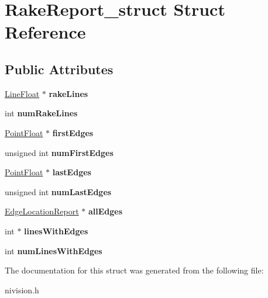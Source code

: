 \hypertarget{structRakeReport__struct}{\section{\-Rake\-Report\-\_\-struct \-Struct \-Reference}
\label{structRakeReport__struct}
}
\subsection*{\-Public \-Attributes}
\begin{DoxyCompactItemize}
\item 
\hypertarget{structRakeReport__struct_a276bba2b546a316be66d5e752a305bc9}{\hyperlink{structLineFloat__struct}{\-Line\-Float} $\ast$ {\bfseries rake\-Lines}}\label{structRakeReport__struct_a276bba2b546a316be66d5e752a305bc9}

\item 
\hypertarget{structRakeReport__struct_afddc894d706aaebec5d45d087aa1ed3c}{int {\bfseries num\-Rake\-Lines}}\label{structRakeReport__struct_afddc894d706aaebec5d45d087aa1ed3c}

\item 
\hypertarget{structRakeReport__struct_ac42787ae1e409a510756bbe14e24ad09}{\hyperlink{structPointFloat__struct}{\-Point\-Float} $\ast$ {\bfseries first\-Edges}}\label{structRakeReport__struct_ac42787ae1e409a510756bbe14e24ad09}

\item 
\hypertarget{structRakeReport__struct_ab037f1b1f28514231ff44f99e2f6457b}{unsigned int {\bfseries num\-First\-Edges}}\label{structRakeReport__struct_ab037f1b1f28514231ff44f99e2f6457b}

\item 
\hypertarget{structRakeReport__struct_a02baaf2e3560e8054f9ccb9cd397f7c2}{\hyperlink{structPointFloat__struct}{\-Point\-Float} $\ast$ {\bfseries last\-Edges}}\label{structRakeReport__struct_a02baaf2e3560e8054f9ccb9cd397f7c2}

\item 
\hypertarget{structRakeReport__struct_a5a8f3e5b0e91f779d1f5cc67f46b6f2c}{unsigned int {\bfseries num\-Last\-Edges}}\label{structRakeReport__struct_a5a8f3e5b0e91f779d1f5cc67f46b6f2c}

\item 
\hypertarget{structRakeReport__struct_a6d306895c02ccdf39974d8b904e7577b}{\hyperlink{structEdgeLocationReport__struct}{\-Edge\-Location\-Report} $\ast$ {\bfseries all\-Edges}}\label{structRakeReport__struct_a6d306895c02ccdf39974d8b904e7577b}

\item 
\hypertarget{structRakeReport__struct_a6d2d096ac0ee72cefc33bd88103a6e7f}{int $\ast$ {\bfseries lines\-With\-Edges}}\label{structRakeReport__struct_a6d2d096ac0ee72cefc33bd88103a6e7f}

\item 
\hypertarget{structRakeReport__struct_a13da20574b34e761cc41b2faca627b24}{int {\bfseries num\-Lines\-With\-Edges}}\label{structRakeReport__struct_a13da20574b34e761cc41b2faca627b24}

\end{DoxyCompactItemize}


\-The documentation for this struct was generated from the following file\-:\begin{DoxyCompactItemize}
\item 
nivision.\-h\end{DoxyCompactItemize}
